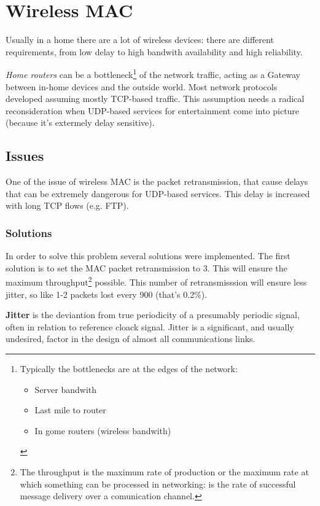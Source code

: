 \chapter{Wireless MAC}


Usually in a home there are a lot of wireless devices: there are different
requirements, from low delay to high bandwith availability and high reliability.

\textit{Home routers} can be a bottleneck\footnote{
  Typically the bottlenecks are at the edges of the network:
  \begin{itemize}
  \item Server bandwith
  \item Last mile to router
  \item In gome routers (wireless bandwith)
  \end{itemize}
}
of the network traffic, acting as a Gateway between in-home devices and the
outside world.
Most network protocols developed assuming mostly TCP-based traffic. This
assumption needs a radical reconsideration when UDP-based services for
entertainment come into picture (because it's extermely delay sensitive).

\section{Issues}

One of the issue of wireless MAC is the packet retransmission, that cause delays
that can be extremely dangerous for UDP-based services. This delay is increased
with long TCP flows (e.g. FTP).

\subsection{Solutions}

In order to solve this problem several solutions were implemented. The first
solution is to set the MAC packet retransmission to 3. This will ensure the
maximum throughput\footnote{
  The throughput is the maximum rate of production or the maximum rate at which
  something can be processed in networking: is the rate of successful message
  delivery over a comunication channel.
}
possible. This number of retransmisssion will ensure less jitter, so like 1-2
packets lost every 900 (that's 0.2\%).

\textbf{Jitter} is the deviantion from true periodicity of a presumably periodic
signal, often in relation to reference cloack signal. Jitter is a significant,
and usually undesired, factor in the design of almost all communications links.

